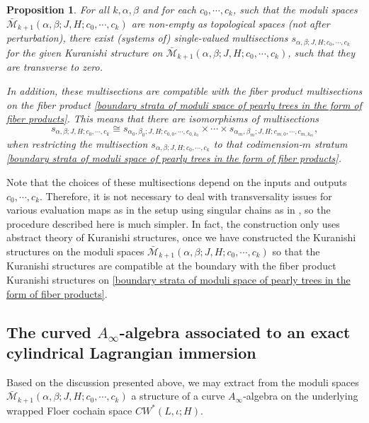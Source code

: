 \documentclass{amsart}
\newtheorem{proposition}[theorem]{Proposition}
\numberwithin{equation}{section}
\numberwithin{figure}{section}
\begin{document}
\begin{proposition} \label{compatible system of single-valued multisections}
	For all $k, \alpha, \beta$ and for each $c_{0}, \cdots, c_{k}$, such that the moduli spaces $\bar{\mathcal{M}}_{k+1}(\alpha, \beta; J, H; c_{0}, \cdots, c_{k})$ are non-empty as topological spaces (not after perturbation), there exist (systems of) single-valued multisections $s_{\alpha, \beta; J, H; c_{0}, \cdots, c_{k}}$ for the given Kuranishi structure on $\bar{\mathcal{M}}_{k+1}(\alpha, \beta; J, H; c_{0}, \cdots, c_{k})$, such that they are transverse to zero. \par
	In addition, these multisections are compatible with the fiber product multisections on the fiber product \eqref{boundary strata of moduli space of pearly trees in the form of fiber products}. This means that there are isomorphisms of multisections
\begin{equation}\label{fiber product multisections}
s_{\alpha, \beta; J, H; c_{0}, \cdots, c_{k}} \cong
s_{\alpha_{0}, \beta_{0}; J, H; c_{0, 0}, \cdots, c_{0, k_{0}}} \times \cdots \times
s_{\alpha_{m}, \beta_{m}; J, H; c_{m, 0}, \cdots, c_{m, k_{m}}},
\end{equation}
when restricting the multisection $s_{\alpha, \beta; J, H; c_{0}, \cdots, c_{k}}$ to that codimension-$m$ stratum \eqref{boundary strata of moduli space of pearly trees in the form of fiber products}.
\end{proposition}

	Note that the choices of these multisections depend on the inputs and outputs $c_{0}, \cdots, c_{k}$. Therefore, it is not necessary to deal with transversality issues for various evaluation maps as in the setup using singular chains as in \cite{FOOO2}, so the procedure described here is much simpler. In fact, the construction only uses abstract theory of Kuranishi structures, once we have constructed the Kuranishi structures on the moduli spaces $\bar{\mathcal{M}}_{k+1}(\alpha, \beta; J, H; c_{0}, \cdots, c_{k})$ so that the Kuranishi structures are compatible at the boundary with the fiber product Kuranishi structures on \eqref{boundary strata of moduli space of pearly trees in the form of fiber products}. \par

\subsection{The curved $A_{\infty}$-algebra associated to an exact cylindrical Lagrangian immersion} \label{curved A-infinity algebra associated to exact cylindrical Lagrangian immersions}
	Based on the discussion presented above, we may extract from the moduli spaces $\bar{\mathcal{M}}_{k+1}(\alpha, \beta; J, H; c_{0}, \cdots, c_{k})$ a structure of a curve $A_{\infty}$-algebra on the underlying wrapped Floer cochain space $CW^{*}(L, \iota; H)$. \par
\end{document}

